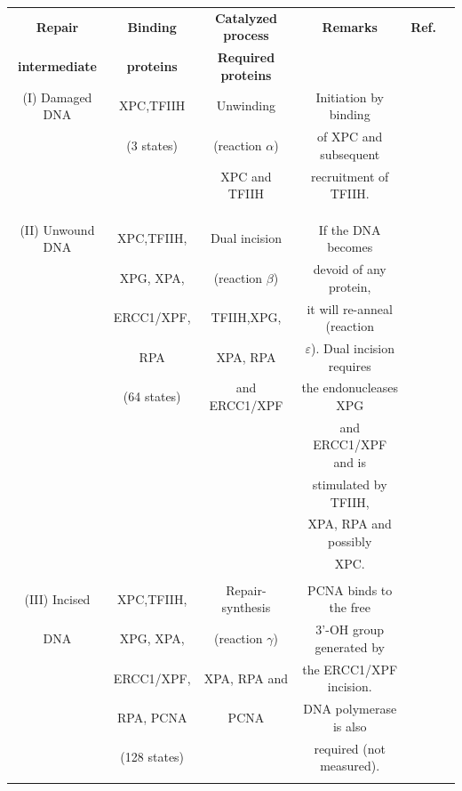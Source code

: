 \begin{table}[h]
	\small{
		\begin{tabular}{cccccc}
			\hline
			\rule{0pt}{2ex}
			\textbf{Repair}&\textbf{Binding} &	\textbf{Catalyzed  process}&\textbf{Remarks}  	&\textbf{Ref.} \\ 
			\textbf{intermediate}&	\textbf{proteins} &	\textbf{Required proteins}&	& \\ \hline
			\rule{0pt}{3ex}
			(I) Damaged DNA&	XPC,TFIIH 	&Unwinding &Initiation by binding	&\cite{Evans1997a}
			\\ 
			 &	(3 states)& (reaction $\alpha$)&  of XPC and subsequent &\cite{Riedl2003}\\
			&&XPC and TFIIH&	 recruitment of TFIIH. &\cite{Yokoi:2000:J-Biol-Chem:10734143}\\ 
			&&&&\cite{Rademakers2003}\\ 
			&&&& \cite{Volker2001} \\ 
			&&&&\\\hline
			\rule{0pt}{3ex}
			(II) Unwound DNA&XPC,TFIIH,&Dual incision &If the DNA becomes &\cite{Evans1997a} \\
			& XPG, XPA,&(reaction $\beta$)&devoid of any protein,&\cite{ODonovan:1994:Nature:8090225}\\
			&ERCC1/XPF,&TFIIH,XPG,&it will re-anneal (reaction &\cite{Sijbers:1996:Cell:8797827}\\
			&  RPA& XPA,  RPA&$\varepsilon$). Dual incision requires&\cite{Winkler2001}\\
			&(64 states)&and ERCC1/XPF&the endonucleases XPG& \cite{deLaat:1998:Genes-Dev:9716411}\\
			&&&  and ERCC1/XPF and is&\\
			&&&stimulated by TFIIH, &\\
			&&&XPA, RPA and possibly &\\
			&&&XPC.&\\
			&&&& \\ \hline
			\rule{0pt}{3ex}
			(III) Incised&XPC,TFIIH,&Repair-synthesis&PCNA binds to the free&\cite{Evans1997a}\\
			DNA& XPG, XPA,& (reaction $\gamma$)&3'-OH group generated by&\cite{Winkler2001}\\
			& ERCC1/XPF,&XPA, RPA and&  the ERCC1/XPF incision.&\\
			&RPA, PCNA& PCNA& DNA polymerase is also&\\
			&(128 states)&& required (not measured).	&\\
			&&&& \\   \hline

\end{tabular}}
\end{table}
